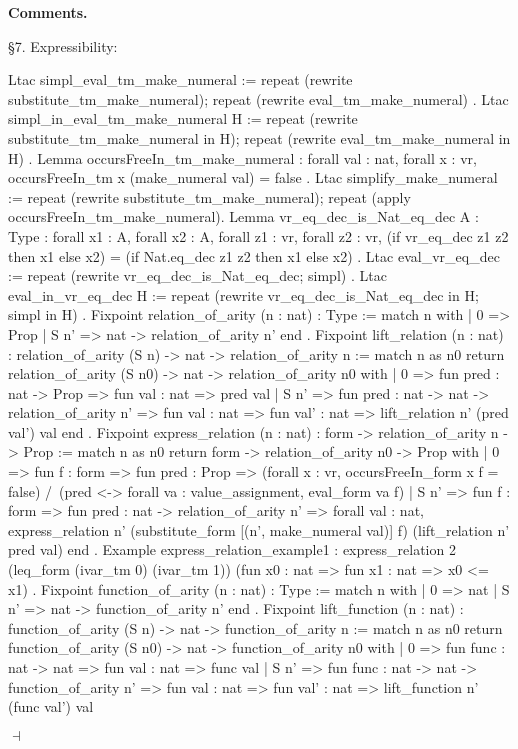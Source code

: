 \documentclass[12pt]{paper}
\newenvironment{context}[1][]
{ \noindent \textbf{{#1}.}
}
{ \hfill $ \dashv $
}
\begin{document}
\begin{context}[Comments]
    \S7. Expressibility:
    \begin{coqcode}
Ltac simpl_eval_tm_make_numeral :=
  repeat (rewrite substitute_tm_make_numeral); repeat (rewrite eval_tm_make_numeral)
.
Ltac simpl_in_eval_tm_make_numeral H :=
  repeat (rewrite substitute_tm_make_numeral in H); repeat (rewrite eval_tm_make_numeral in H)
.
Lemma occursFreeIn_tm_make_numeral :
  forall val : nat,
  forall x : vr,
  occursFreeIn_tm x (make_numeral val) = false
.
Ltac simplify_make_numeral := repeat (rewrite substitute_tm_make_numeral); repeat (apply occursFreeIn_tm_make_numeral).
Lemma vr_eq_dec_is_Nat_eq_dec {A : Type} :
  forall x1 : A,
  forall x2 : A,
  forall z1 : vr,
  forall z2 : vr,
  (if vr_eq_dec z1 z2 then x1 else x2) = (if Nat.eq_dec z1 z2 then x1 else x2)
.
Ltac eval_vr_eq_dec :=
  repeat (rewrite vr_eq_dec_is_Nat_eq_dec; simpl)
.
Ltac eval_in_vr_eq_dec H :=
  repeat (rewrite vr_eq_dec_is_Nat_eq_dec in H; simpl in H)
.
Fixpoint relation_of_arity (n : nat) : Type :=
  match n with
  | 0 => Prop
  | S n' => nat -> relation_of_arity n'
  end
.
Fixpoint lift_relation (n : nat) : relation_of_arity (S n) -> nat -> relation_of_arity n :=
  match n as n0 return relation_of_arity (S n0) -> nat -> relation_of_arity n0 with
  | 0 =>
    fun pred : nat -> Prop =>
    fun val : nat =>
    pred val
  | S n' =>
    fun pred : nat -> nat -> relation_of_arity n' =>
    fun val : nat =>
    fun val' : nat =>
    lift_relation n' (pred val') val 
  end
.
Fixpoint express_relation (n : nat) : form -> relation_of_arity n -> Prop :=
  match n as n0 return form -> relation_of_arity n0 -> Prop with
  | 0 =>
    fun f : form =>
    fun pred : Prop =>
    (forall x : vr, occursFreeIn_form x f = false) /\ (pred <-> forall va : value_assignment, eval_form va f)
  | S n' =>
    fun f : form =>
    fun pred : nat -> relation_of_arity n' =>
    forall val : nat, express_relation n' (substitute_form [(n', make_numeral val)] f) (lift_relation n' pred val)
  end
.
Example express_relation_example1 :
  express_relation 2 (leq_form (ivar_tm 0) (ivar_tm 1)) (fun x0 : nat => fun x1 : nat => x0 <= x1)
.
Fixpoint function_of_arity (n : nat) : Type :=
  match n with
  | 0 => nat
  | S n' => nat -> function_of_arity n'
  end
.
Fixpoint lift_function (n : nat) : function_of_arity (S n) -> nat -> function_of_arity n :=
  match n as n0 return function_of_arity (S n0) -> nat -> function_of_arity n0 with
  | 0 =>
    fun func : nat -> nat =>
    fun val : nat =>
    func val
  | S n' =>
    fun func : nat -> nat -> function_of_arity n' =>
    fun val : nat =>
    fun val' : nat =>
    lift_function n' (func val') val 

\end{coqcode}
\end{context}
\end{document}
